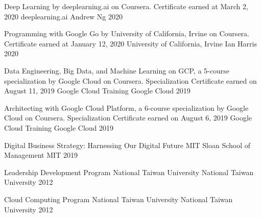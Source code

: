 

\begin{cvhonors}

  \cvhonor
    {Deep Learning by deeplearning.ai on Coursera. Certificate earned at March 2, 2020} %
    {deeplearning.ai} %
    {Andrew Ng} %
    {2020} %

  \cvhonor
    {Programming with Google Go by University of California, Irvine on Coursera. Certificate earned at January 12, 2020} %
    {University of California, Irvine} %
    {Ian Harris} %
    {2020} %

  \cvhonor
    {Data Engineering, Big Data, and Machine Learning on GCP, a 5-course specialization by Google Cloud on Coursera. Specialization Certificate earned on August 11, 2019} %
    {Google Cloud Training} %
    {Google Cloud} %
    {2019} %

  \cvhonor
    {Architecting with Google Cloud Platform, a 6-course specialization by Google Cloud on Coursera. Specialization Certificate earned on August 6, 2019} %
    {Google Cloud Training} %
    {Google Cloud} %
    {2019} %

  \cvhonor
    {Digital Business Strategy: Harnessing Our Digital Future} %
    {MIT Sloan School of Management} %
    {MIT} %
    {2019} %

  \cvhonor
    {Leadership Development Program} %
    {National Taiwan University} %
    {National Taiwan University} %
    {2012} %

  \cvhonor
    {Cloud Computing Program} %
    {National Taiwan University} %
    {National Taiwan University} %
    {2012} %

\end{cvhonors}

